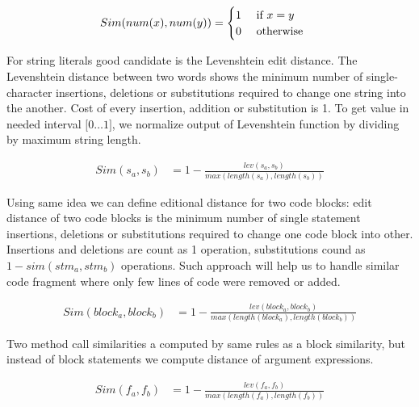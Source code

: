 \begin{mydef}
\begin{align*}
Sim(num(x), num(y)) &= 
	\begin{cases} 
		\hfill 1  \hfill & \text{ if $x = y$ } \\
		\hfill 0	\hfill & \text{ otherwise } \\
	\end{cases}
\end{align*}
\end{mydef}

For string literals good candidate is the Levenshtein edit distance\cite{surveys/navarro01}.
The Levenshtein distance between two words shows the minimum number of single-character insertions, deletions or substitutions required to change one string into the another.
Cost of every insertion, addition or substitution is 1.
To get value in needed interval $\lbrack 0 \ldots 1 \rbrack$, we normalize output of Levenshtein function by dividing by maximum string length.

\begin{mydef}
\begin{align*}
Sim(s_a, s_b) &= 1 - \frac{lev(s_a,s_b)}{max(length(s_a), length(s_b))}
\end{align*}
\end{mydef}

Using same idea we can define editional distance for two code blocks: edit distance of two code blocks is the minimum
number of single statement insertions, deletions or substitutions required to change one code block into other.
Insertions and deletions are count as 1 operation, substitutions cound as $1 - sim(stm_a, stm_b)$ operations.
Such approach will help us to handle similar code fragment where only few lines of code were removed or added.

\begin{mydef}
\begin{align*}
	Sim(block_a, block_b) &= 1 - \frac{lev(block_a,block_b)}{max(length(block_a), length(block_b))}
\end{align*}

\end{mydef}


Two method call similarities a computed by same rules as a block similarity, but instead of block statements we compute
distance of argument expressions.

\begin{mydef}
\begin{align*}
	Sim(f_a, f_b) &= 1 - \frac{lev(f_a,f_b)}{max(length(f_a), length(f_b))}
\end{align*}
\end{mydef}



